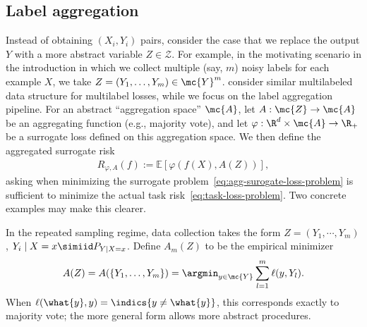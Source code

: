 \documentclass[11pt]{article}
\newcommand{\brk}[1]{\left[{#1}\right]} %
\newcommand{\dstr}{P}
\newcommand{\sY}{\mathcal{Y}} %
\newcommand{\tloss}{\ell}  %
\newcommand{\sloss}{\varphi}  %
\begin{document}
\subsection{Label aggregation}

Instead of obtaining $(X_i, Y_i)$ pairs, consider
the case that we replace the output $Y$ with a more abstract
variable $Z \in \mathcal{Z}$.
%
For example, in the motivating scenario in the introduction in which we
collect multiple (say, $m$) noisy labels for each example $X$, we
take $Z = (Y_1, \ldots, Y_m) \in \mc{Y}^m$.
%
\citet{MaoMoZh24} consider similar multilabeled 
data structure for multilabel losses, while we focus on the label aggregation pipeline.
%
For an abstract ``aggregation space'' $\mc{A}$, let $A : \mc{Z} \to \mc{A}$
be an aggregating function (e.g., majority vote),
and
let $\sloss : \R^d \times \mc{A} \to \R_+$ be a surrogate loss
defined on this aggregation space.
%
We then define the aggregated surrogate risk
\begin{align}
  R_{\sloss,A}(f) := \mathbb{E} \brk{\sloss(f(X),
    A(Z))}, \label{eq:agg-surogate-loss-problem}
\end{align}
asking when minimizing the surrogate
problem~\eqref{eq:agg-surogate-loss-problem} is sufficient to
minimize the actual task risk~\eqref{eq:task-loss-problem}.
%
%
Two concrete examples may make this clearer.

\begin{example} \label{example:mv}
  In the repeated sampling regime, data collection takes the
  form $Z=(Y_1,\cdots,Y_m)$, $Y_i \mid X = x \simiid
  \dstr_{Y \mid X=x}$.
  Define
  $A_m(Z)$ to be the 
  empirical minimizer
  \begin{align*}
    A(Z) = A(\{Y_1, \ldots, Y_m\})
    =\argmin_{y \in \mc{Y}}
    \sum_{l = 1}^m \tloss(y, Y_l). %
  \end{align*}
  When $\tloss(\what{y}, y) = \indics{y \neq \what{y}}$,
  this corresponds exactly to majority vote; the more
  general form allows more abstract procedures.
\end{example}
\end{document}
